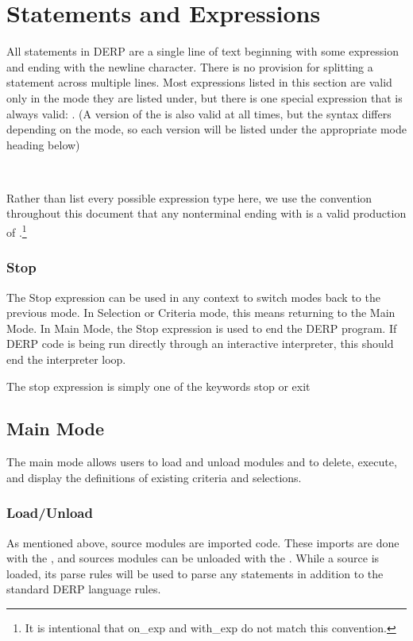 \section{Statements and Expressions}
All statements in DERP are a single line of text beginning with some expression 
and ending with the newline character. There is no provision for splitting a 
statement across multiple lines. Most expressions listed in this section are 
valid only in the mode they are listed under, but there is one special expression 
that is always valid: . (A version of the  
is also valid at all times, but the syntax differs depending on the mode, so each version 
will be listed under the appropriate mode heading below)
\begin{center}
     \\
\end{center}

Rather than list every possible expression type here, we use the convention throughout 
this document that any nonterminal ending with  is a valid production of 
.\footnote{It is intentional that on\_exp and with\_exp do not match this convention.}

\subsubsection{Stop}
The Stop expression can be used in any context to switch modes back to the previous mode. In Selection 
or Criteria mode, this means returning to the Main Mode. In Main Mode, the Stop expression is used to 
end the DERP program. If DERP code is being run directly through an interactive interpreter, this should 
end the interpreter loop.

The stop expression is simply one of the keywords stop or exit
\begin{center}
     
\end{center}

\subsection{Main Mode}
The main mode allows users to load and unload modules and to delete, execute, and display the definitions 
of existing criteria and selections.

\subsubsection{Load/Unload}
As mentioned above, source modules are imported code. These imports are done with the , 
and sources modules can be unloaded with the . While a source is loaded, its parse 
rules will be used to parse any statements in addition to the standard DERP language rules.

